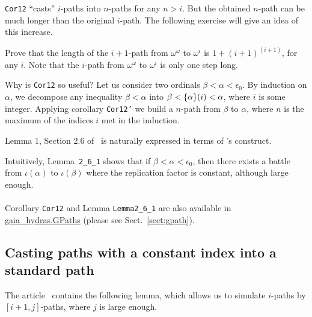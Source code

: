 \begin{remark}
 \texttt{Cor12} ``casts'' $i$-paths into $n$-paths for any $n>i$.
But the obtained $n$-path can be much longer than the original $i$-path.
The following exercise will give an idea of this increase. 
\end{remark}

\begin{exercise}
  Prove that  the length of the $i+1$-path from
  $\omega^\omega$ to $\omega^i$ is $1 + (i+1)^{(i+1)}$, for any $i$. Note that the $i$-path from
  $\omega^\omega$ to $\omega^i$ is only one step long.
 \end{exercise}




Why is \texttt{Cor12} so useful? 
Let us  consider two ordinals  $\beta<\alpha<\epsilon_0$. By induction on $\alpha$,
we decompose any inequality $\beta<\alpha$ into $\beta < \mbox{$\{\alpha\}(i)$}< \alpha$, where $i$ is some integer. Applying corollary \texttt{Cor12'} we build a $n$-path from $\beta$ to $\alpha$,
where $n$ is the maximum of the indices $i$ met in the induction.

 Lemma 1, Section 2.6 of~\cite{KS81} is naturally expressed in terms of \coq's
\verb@sig@ construct.

\label{lemma:L-2_6-1}




Intuitively, Lemma~\texttt{2\_6\_1}  shows that if $\beta<\alpha<\epsilon_0$, then there exists  a battle from $\iota(\alpha)$ to $\iota(\beta)$ where the replication factor is constant, although large enough. 






 \paragraph*{\gaiasign}
 Corollary \texttt{Cor12} and Lemma \texttt{Lemma2\_6\_1} are also available in
\href{../theories/html/gaia_hydras.GPaths.html}{gaia\_hydras.GPaths} 
(please see Sect.~\vref{sect:gpath}).

\subsection{Casting paths with a constant index into a standard path}


The article~\cite{KS81} contains 
the following lemma, which allows us to simulate $i$-paths by $[i+1,j]$-paths, where $j$ is large enough.

